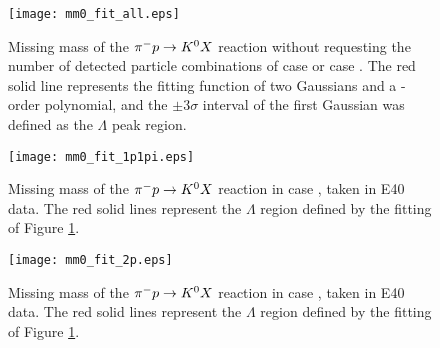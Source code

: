 \begin{figure}[!h]
  \begin{center}
    \texttt{[image: mm0\_fit\_all.eps]}
    \caption{Missing mass of the $\pi^- p \to K^0 X$ reaction without requesting the number of detected particle combinations of case  or case . The red solid line represents the fitting function of two Gaussians and a -order polynomial, and the $\pm3\sigma$ interval of the first Gaussian was defined as the $\Lambda$ peak region.}
    \label{fig-mm_lam}
  \end{center}
\end{figure}

\begin{figure}[!h]
  \begin{center}
    \texttt{[image: mm0\_fit\_1p1pi.eps]}
    \caption{Missing mass of the $\pi^- p \to K^0 X$ reaction in case , taken in E40 data. The red solid lines represent the $\Lambda$ region defined by the fitting of Figure \ref{fig-mm_lam}.}
    \label{fig-mm0_1p1pi}
  \end{center}
\end{figure}

\begin{figure}[!h]
  \begin{center}
    \texttt{[image: mm0\_fit\_2p.eps]}
    \caption{Missing mass of the $\pi^- p \to K^0 X$ reaction in case , taken in E40 data. The red solid lines represent the $\Lambda$ region defined by the fitting of Figure \ref{fig-mm_lam}.}
    \label{fig-mm0_2p}
  \end{center}
\end{figure}


